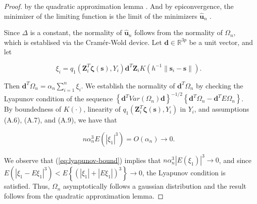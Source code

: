 \documentclass[authoryear,review, 12pt]{elsarticle}
\begin{document}
\begin{proof}
by the quadratic approximation lemma \citep{Fan-Gijbels-1996}. And
by epiconvergence, the minimizer of the limiting function is the limit
of the minimizers $\hat{\bm{u}}_{n}$ \citep{Geyer-1994,Knight-Fu-2000}.

Since $\Delta$ is a constant, the normality of $\hat{\bm{u}}_{n}$
follows from the normality of $\Omega_{n}$, which is establised via
the Cram\'{e}r-Wold device. Let $\bm{d}\in\mathbb{R}^{3p}$ be a
unit vector, and let

\[
\xi_{i}=q_{1}\left(\bm{Z}_{i}^{T}\bm{\zeta}(\bm{s}),Y_{i}\right)\bm{d}^{T}\bm{Z}_{i}K\left(h^{-1}\|\bm{s}_{i}-\bm{s}\|\right).
\]


Then $\bm{d}^{T}\Omega_{n}=\alpha_{n}\sum_{i=1}^{n}\xi_{i}$. We establish
the normality of $\bm{d}^{T}\Omega_{n}$ by checking the Lyapunov
condition of the sequence $\left\{ \bm{d}^{T}Var\left(\Omega_{n}\right)\bm{d}\right\} ^{-1/2}\left\{ \bm{d}^{T}\Omega_{n}-\bm{d}^{T}E\Omega_{n}\right\} $.
By boundedness of $K\left(\cdot\right)$, linearity of $q_{1}\left(\bm{Z}_{i}^{T}\bm{\zeta}(\bm{s}),Y_{i}\right)$
in $Y_{i}$, and assumptions (A.6), (A.7), and (A.9), we have that

\begin{equation}
n\alpha_{n}^{3}E\left(\left|\xi_{1}\right|^{3}\right)=O\left(\alpha_{n}\right)\to0.\label{eq:lyapunov-bound}
\end{equation}


We observe that (\ref{eq:lyapunov-bound}) implies that $n\alpha_{n}^{3}\left|E\left(\xi_{1}\right)\right|^{3}\to0$,
and since $E\left(\left|\xi_{1}-E\xi_{1}\right|^{3}\right)<E\left\{ \left(\left|\xi_{1}\right|+\left|E\xi_{1}\right|\right)^{3}\right\} \to0$,
the Lyapunov condition is satisfied. Thus, $\Omega_{n}$ asymptotically
follows a gaussian distribution and the result follows from the quadratic
approximation lemma.
\end{proof}
\end{document}

